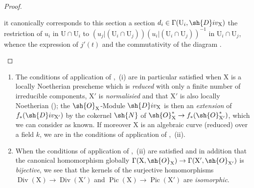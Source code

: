 \begin{proof}
\begin{enumerate}[label=(\roman*)]
it canonically corresponds to this section a section $d_i\in\Gamma(\mathrm{U}_i,\sh{D}iv_\mathrm{X})$ the restriction of $u_i$ in $\mathrm{U}\cap\mathrm{U}_i$ to $(u_j|(\mathrm{U}_i\cap\mathrm{U}_j))(u_i|(\mathrm{U}_i\cap\mathrm{U}_j))^{-1}$ in $\mathrm{U}_i\cap\mathrm{U}_j$, whence the expression of $j'(t)$ and the commutativity of the diagram .
\end{enumerate}
\end{proof}

\begin{remark}[21.8.6]
\label{IV.21.8.6}
\begin{enumerate}[label=(\roman*)]
  \item The conditions of application of ,{}~(i) are in particular satisfied when $\mathrm{X}$ is a locally Noetherian prescheme which is \emph{reduced} with only a finite number of irreducible components, $\mathrm{X}'$ is \emph{normalisied} and that $\mathrm{X}'$ is also locally Noetherian ();
the $\sh{O}_\mathrm{X}$-Module $\sh{D}iv_\mathrm{X}$ is then an \emph{extension} of $f_*(\sh{D}iv_{\mathrm{X}'})$ by the cokernel $\sh{N}$ of $\sh{O}^*_\mathrm{X}\to f_*(\sh{O}^*_{\mathrm{X}'})$, which we can consider as known.
If moreover $\mathrm{X}$ is an algebraic curve (reduced) over a field $k$, we are in the conditions of application of ,{}~(ii).

  \item When the conditions of application of ,{}~(ii) are satisfied and in addition that the canonical homomorphism globally $\Gamma(\mathrm{X},\sh{O}_\mathrm{X})\to\Gamma(\mathrm{X}',\sh{O}_{\mathrm{X}'})$ is \emph{bijective}, we see that the kernels of the surjective homomorphisms $\operatorname{Div}(\mathrm{X})\to\operatorname{Div}(\mathrm{X}')$ and $\operatorname{Pic}(\mathrm{X})\to\operatorname{Pic}(\mathrm{X}')$ are \emph{isomorphic}.


\end{enumerate}
\end{remark}
